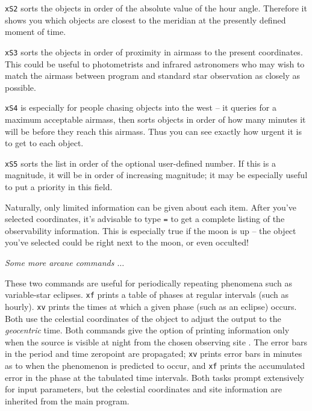 \item{\tt xS2} sorts the objects in order of the absolute value of the
hour angle.  Therefore it shows you which objects are closest to the
meridian at the presently defined moment of time.

\item{\tt xS3} sorts the objects in order of proximity in airmass to the
present coordinates.  This could be useful to photometrists and
infrared astronomers who may wish to match the airmass between  
program and standard star observation as closely as possible.

\item{\tt xS4} is especially for people chasing objects into the
west -- it queries for a maximum acceptable airmass, then sorts objects
in order of how many minutes it will be before they reach this airmass.
Thus you can see exactly how urgent it is to get to each object.

\item{\tt xS5} sorts the list in order of the optional user-defined
number.  If this is a magnitude, it will be in order of increasing
magnitude; it may be especially useful to put a priority in this
field.  
  
Naturally, only limited information can be given about each item.
After you've selected coordinates, it's advisable to type {\tt =}
to get a complete listing of the observability information.  This is
especially true if the moon is up -- the object you've selected
could be right next to the moon, or even occulted!  

\bigskip

\centerline{\it Some more arcane commands $\ldots$}


These two commands are useful for periodically repeating phenomena such as
variable-star eclipses.  {\tt xf} prints a table of phases
at regular intervals (such as hourly). {\tt xv} prints 
the times at which a given phase (such as an eclipse) occurs.
Both use the celestial coordinates of the object to adjust
the output to the {\it geocentric} time.  Both commands
give the option of printing information only when the source
is visible at night from the chosen observing site .  
The error bars in the period and time zeropoint
are propagated; {\tt xv} prints error bars in minutes as to
when the phenomenon is predicted to occur, and {\tt xf} prints
the accumulated error in the phase at the tabulated time 
intervals.  Both tasks prompt extensively for input
parameters, but the celestial coordinates and site information
are inherited from the main program.

